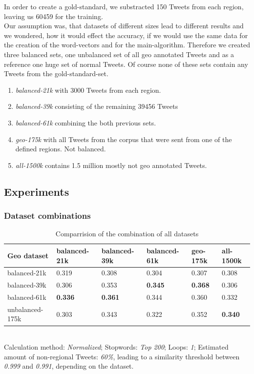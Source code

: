 \documentclass[../Main.tex]{subfiles}
\begin{document}
In order to create a gold-standard, we substracted 150 Tweets from each region, leaving us 60459 for the training. \\
Our assumption was, that datasets of different sizes lead to different results and we wondered, how it would effect the accuracy, if we would use the same data for the creation of the word-vectors and for the main-algorithm. Therefore we created three balanced sets, one unbalanced set of all geo annotated Tweets and as a reference one huge set of normal Tweets. Of course none of these sets contain any Tweets from the gold-standard-set.
 \begin{enumerate}
\item \emph{balanced-21k} with 3000 Tweets from each region.
\item \emph{balanced-39k} consisting of the remaining 39456 Tweets
\item \emph{balanced-61k} combining the both previous sets. 
\item \emph{geo-175k} with all Tweets from the corpus that were sent from one of the defined regions. Not balanced.
\item \emph{all-1500k} contains 1.5 million mostly not geo annotated Tweets.
\end{enumerate}
\subsection{Experiments}
\subsubsection{Dataset combinations}
\begin{table}[b]
    \begin{tabular}{|l|lllll|}
    \hline
    Geo dataset     & balanced-21k & balanced-39k & balanced-61k & geo-175k & all-1500k \\ \hline
    balanced-21k    & 0.319        & 0.308        & 0.304        & 0.307           & 0.308       \\
    balanced-39k    & 0.306        & 0.353       & \textbf{0.345}        & \textbf{0.368 }          & 0.306       \\
    balanced-61k    & \textbf{0.336}        & \textbf{0.361}        & 0.344        &0.360           & 0.332       \\
    unbalanced-175k & 0.303        & 0.343        & 0.322        & 0.352           & \textbf{0.340}       \\ \hline
    \end{tabular} \\

  Calculation method: \textit{Normalized}; Stopwords: \textit{Top 200}; Loops: \textit{1}; Estimated amount of non-regional Tweets: \textit{60\%}, leading to a similarity threshold between \textit{0.999} and \textit{0.991}, depending on the dataset.
  \caption{Comparrision of the combination of all datasets}
  \label{geo_datasets}
\end{table}
\end{document}
